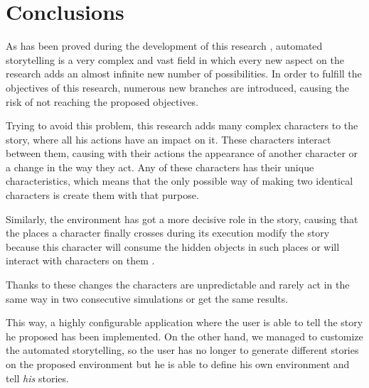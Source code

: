 %
%
\chapter*{Conclusions}

\begin{FraseCelebre}
\begin{Frase}
\end{Frase}
\begin{Fuente}
\end{Fuente}
\end{FraseCelebre}

\label{cap32:sec:Conclusions}

As has been proved during the development of this research , automated storytelling is a very complex and vast field in which every new aspect on the research adds an almost infinite new number of possibilities. In order to fulfill the objectives of this research, numerous new branches are introduced, causing the risk of not reaching the proposed objectives.


Trying to avoid this problem, this research adds many complex characters to the story, where all his actions have an impact on it. These characters interact between them, causing with their actions the appearance of another character or a change in the way they act. Any of these characters has their unique characteristics, which means that the only possible way of making two identical characters is create them with that purpose.


Similarly, the environment has got a more decisive role in the story, causing that the places a character finally crosses during its execution modify the story because this character will consume the hidden objects in such places or will interact with characters on them .



Thanks to these changes the characters are unpredictable and rarely act in the same way in two consecutive simulations or get the same results.


This way, a highly configurable application where the user is able to tell the story he proposed has been implemented.
On the other hand, we managed to customize the automated storytelling, so the user has no longer to generate different stories on the proposed environment but he is able to define his own environment and tell \emph{his} stories.


